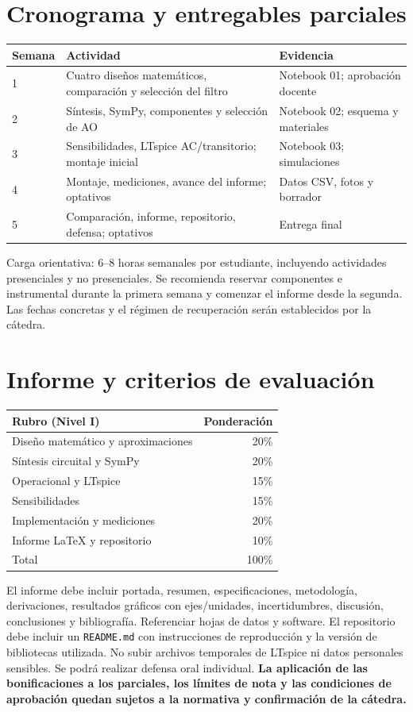 \documentclass[11pt,a4paper]{article}
\begin{document}
\section{Cronograma y entregables parciales}
\begin{center}\begin{tabular}{p{1.5cm}p{9cm}p{3cm}}\toprule
Semana & Actividad & Evidencia\\\midrule
1 & Cuatro diseños matemáticos, comparación y selección del filtro & Notebook 01; aprobación docente\\
2 & Síntesis, SymPy, componentes y selección de AO & Notebook 02; esquema y materiales\\
3 & Sensibilidades, LTspice AC/transitorio; montaje inicial & Notebook 03; simulaciones\\
4 & Montaje, mediciones, avance del informe; optativos & Datos CSV, fotos y borrador\\
5 & Comparación, informe, repositorio, defensa; optativos & Entrega final\\
\bottomrule
\end{tabular}\end{center}
Carga orientativa: 6--8 horas semanales por estudiante, incluyendo actividades presenciales y no presenciales. Se recomienda reservar componentes e instrumental durante la primera semana y comenzar el informe desde la segunda. Las fechas concretas y el régimen de recuperación serán establecidos por la cátedra.
\section{Informe y criterios de evaluación}
\begin{center}\begin{tabular}{lr}\toprule
Rubro (Nivel I) & Ponderación\\\midrule
Diseño matemático y aproximaciones & 20\%\\
Síntesis circuital y SymPy & 20\%\\
Operacional y LTspice & 15\%\\
Sensibilidades & 15\%\\
Implementación y mediciones & 20\%\\
Informe LaTeX y repositorio & 10\%\\\midrule
Total & 100\%\\\bottomrule
\end{tabular}\end{center}
El informe debe incluir portada, resumen, especificaciones, metodología, derivaciones, resultados gráficos con ejes/unidades, incertidumbres, discusión, conclusiones y bibliografía. Referenciar hojas de datos y software. El repositorio debe incluir un \texttt{README.md} con instrucciones de reproducción y la versión de bibliotecas utilizada. No subir archivos temporales de LTspice ni datos personales sensibles. Se podrá realizar defensa oral individual. \textbf{La aplicación de las bonificaciones a los parciales, los límites de nota y las condiciones de aprobación quedan sujetos a la normativa y confirmación de la cátedra.}
\end{document}
